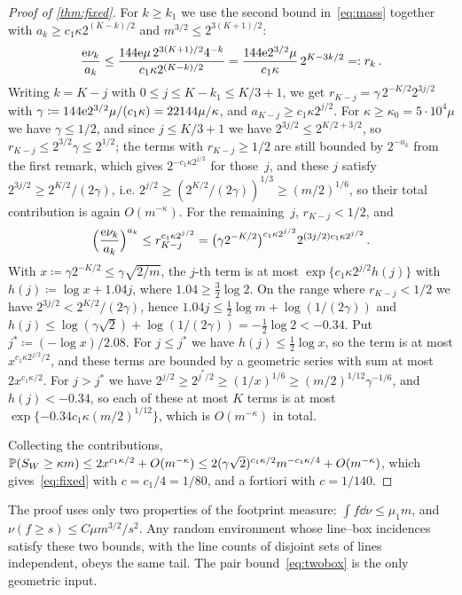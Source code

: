 \documentclass[11pt,letterpaper]{article}
\begin{document}
\begin{proof}[Proof of \cref{thm:fixed}]
For $k\ge k_1$ we use the second bound in~\eqref{eq:mass} together with $a_k\ge c_1\kappa2^{(K-k)/2}$ and $m^{3/2}\le2^{3(K+1)/2}$:
\begin{equation*}
  \frac{\e\nu_k}{a_k}\le\frac{144\e\mu\,2^{3(K+1)/2}4^{-k}}{c_1\kappa2^{(K-k)/2}}=\frac{144\e2^{3/2}\mu}{c_1\kappa}\,2^{K-3k/2}=:r_k\,.
\end{equation*}
Writing $k=K-j$ with $0\le j\le K-k_1\le K/3+1$, we get $r_{K-j}=\gamma\,2^{-K/2}2^{3j/2}$ with $\gamma\coloneqq144\e2^{3/2}\mu/(c_1\kappa)=22144\mu/\kappa$, and $a_{K-j}\ge c_1\kappa2^{j/2}$. For $\kappa\ge\kappa_0=5\cdot10^4\mu$ we have $\gamma\le1/2$, and since $j\le K/3+1$ we have $2^{3j/2}\le2^{K/2+3/2}$, so $r_{K-j}\le2^{3/2}\gamma\le2^{1/2}$; the terms with $r_{K-j}\ge1/2$ are still bounded by $2^{-a_k}$ from the first remark, which gives $2^{-c_1\kappa2^{j/2}}$ for those~$j$, and these $j$ satisfy $2^{3j/2}\ge2^{K/2}/(2\gamma)$, i.e. $2^{j/2}\ge(2^{K/2}/(2\gamma))^{1/3}\ge(m/2)^{1/6}$, so their total contribution is again $O(m^{-\kappa})$. For the remaining~$j$, $r_{K-j}<1/2$, and
\begin{equation*}
  \Bigl(\frac{\e\nu_k}{a_k}\Bigr)^{a_k}\le r_{K-j}^{c_1\kappa2^{j/2}}=\bigl(\gamma2^{-K/2}\bigr)^{c_1\kappa2^{j/2}}2^{(3j/2)c_1\kappa2^{j/2}}\,.
\end{equation*}
With $x\coloneqq\gamma2^{-K/2}\le\gamma\sqrt{2/m}$, the $j$-th term is at most $\exp\{c_1\kappa2^{j/2}h(j)\}$ with $h(j)\coloneqq\log x+1.04j$, where $1.04\ge\tfrac32\log2$. On the range where $r_{K-j}<1/2$ we have $2^{3j/2}<2^{K/2}/(2\gamma)$, hence $1.04j\le\tfrac12\log m+\log(1/(2\gamma))$ and $h(j)\le\log(\gamma\sqrt2)+\log(1/(2\gamma))=-\tfrac12\log2<-0.34$. Put $j^*\coloneqq(-\log x)/2.08$. For $j\le j^*$ we have $h(j)\le\tfrac12\log x$, so the term is at most $x^{c_1\kappa2^{j/2}/2}$, and these terms are bounded by a geometric series with sum at most $2x^{c_1\kappa/2}$. For $j>j^*$ we have $2^{j/2}\ge2^{j^*/2}\ge(1/x)^{1/6}\ge(m/2)^{1/12}\gamma^{-1/6}$, and $h(j)<-0.34$, so each of these at most $K$ terms is at most $\exp\{-0.34c_1\kappa(m/2)^{1/12}\}$, which is $O(m^{-\kappa})$ in total.

Collecting the contributions, $\P(S_W\ge\kappa m)\le2x^{c_1\kappa/2}+O(m^{-\kappa})\le2(\gamma\sqrt2)^{c_1\kappa/2}m^{-c_1\kappa/4}+O(m^{-\kappa})$, which gives~\eqref{eq:fixed} with $c=c_1/4=1/80$, and a fortiori with $c=1/140$.
\end{proof}

\begin{remark}
The proof uses only two properties of the footprint measure: $\int f\dd\nu\le\mu_1m$, and $\nu(f\ge s)\le C\mu m^{3/2}/s^2$. Any random environment whose line--box incidences satisfy these two bounds, with the line counts of disjoint sets of lines independent, obeys the same tail. The pair bound~\eqref{eq:twobox} is the only geometric input.
\end{remark}
\end{document}
